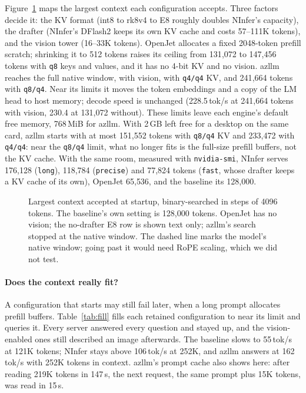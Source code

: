 Figure~\ref{fig:capacity} maps the largest context each configuration accepts. Three factors
decide it: the KV format (int8 to rk8v4 to E8 roughly doubles NInfer's capacity), the drafter
(NInfer's DFlash2 keeps its own KV cache and costs 57--111K tokens), and the vision tower
(16--33K tokens). OpenJet allocates a fixed 2048-token prefill scratch; shrinking it to 512
tokens raises its ceiling from 131{,}072 to 147{,}456 tokens with \texttt{q8} keys and values,
and it has no 4-bit KV and no vision. azllm reaches the full native window, with vision, with
\texttt{q4/q4} KV, and 241{,}664 tokens with \texttt{q8/q4}. Near its limits it moves the token
embeddings and a copy of the LM head to host memory; decode speed is unchanged (228.5\,tok/s at
241{,}664 tokens with vision, 230.4 at 131{,}072 without).
These limits leave each engine's default free memory, 768\,MiB for azllm. With 2\,GB left free
for a desktop on the same card, azllm starts with at most 151{,}552 tokens with \texttt{q8/q4} KV
and 233{,}472 with \texttt{q4/q4}: near the \texttt{q8/q4} limit, what no longer fits is the
full-size prefill buffers, not the KV cache. With the same room, measured with \texttt{nvidia-smi},
NInfer serves 176{,}128 (\texttt{long}), 118{,}784 (\texttt{precise}) and 77{,}824 tokens
(\texttt{fast}, whose drafter keeps a KV cache of its own), OpenJet 65{,}536, and the baseline its
128{,}000.

\begin{figure}[t]
  \centering
  
  \caption{Largest context accepted at startup, binary-searched in steps of 4096 tokens. The
           baseline's own setting is 128{,}000 tokens. OpenJet has no vision; the no-drafter E8
           row is shown text only; azllm's search stopped at the native window. The dashed line
           marks the model's native window; going past it would need RoPE scaling, which we did
           not test.}
  \label{fig:capacity}
\end{figure}

\paragraph{Does the context really fit?}
A configuration that starts may still fail later, when a long prompt allocates prefill buffers.
Table~\ref{tab:fill} fills each retained configuration to near its limit and queries it. Every
server answered every question and stayed up, and the vision-enabled ones still described an
image afterwards. The baseline slows to 55\,tok/s at 121K tokens; NInfer stays above
106\,tok/s at 252K, and azllm answers at 162\,tok/s with 252K tokens in context. azllm's prompt
cache also shows here: after reading 219K tokens in 147\,s, the next request, the same prompt
plus 15K tokens, was read in 15\,s.

